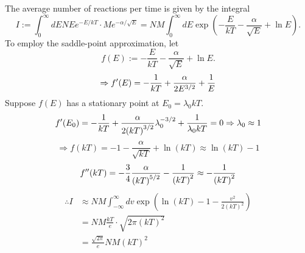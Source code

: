 \item

The average number of reactions per time is given by the integral
\[
    I
    := \int_0^\infty dE N E e^{-E/kT} \cdot M e^{-\alpha / \sqrt{E}}
    = NM \int_0^\infty dE \exp\left( -\frac{E}{kT} - \frac{\alpha}{\sqrt{E}} + \ln E \right).
\]
To employ the saddle-point approximation, let
\[
    f(E) := -\frac{E}{kT} - \frac{\alpha}{\sqrt{E}} + \ln E.
\]
\[
    \Rightarrow f'(E) = -\frac{1}{kT} + \frac{\alpha}{2E^{3/2}} + \frac{1}{E}
\]
Suppose $f(E)$ has a stationary point at $E_0 = \lambda_0 kT$.
\[
    f'(E_0) = -\frac{1}{kT} + \frac{\alpha}{2{(kT)}^{3/2}} \lambda_0^{-3/2} + \frac{1}{\lambda_0 kT} = 0
    \Rightarrow \lambda_0 \approx 1
\]
\[
    \Rightarrow f(kT)
    = -1 - \frac{\alpha}{\sqrt{kT}} + \ln(kT)
    \approx \ln(kT) - 1
\]
\[
    f''(kT)
    = -\frac{3}{4} \frac{\alpha}{{(kT)}^{5/2}} - \frac{1}{{(kT)}^2}
    \approx -\frac{1}{{(kT)}^2}
\]
\begin{align*}
    \therefore I
    &\approx NM \int_{-\infty}^\infty dv \exp\left( \ln(kT) - 1 - \frac{v^2}{2{(kT)}^2} \right) \\
    &= NM \frac{kT}{e} \cdot \sqrt{2\pi {(kT)}^2} \\
    &= \frac{\sqrt{2\pi}}{e} NM {(kT)}^2
\end{align*}